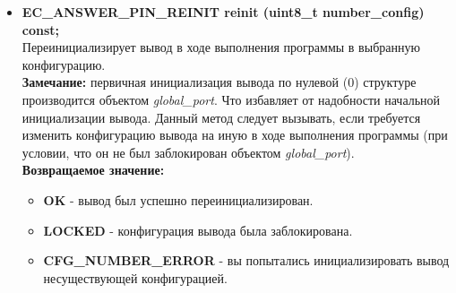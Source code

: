 \begin{itemize}
	\item \textbf{EC\_ANSWER\_PIN\_REINIT	reinit	(uint8\_t number\_config) const;}\\Переинициализирует вывод в ходе выполнения программы в выбранную конфигурацию.\\\textbf{Замечание: }первичная инициализация вывода по нулевой (0) структуре производится объектом \textit{global\_port}. Что избавляет от надобности начальной инициализации вывода. Данный метод следует вызывать, если требуется изменить конфигурацию вывода на иную в ходе выполнения программы (при условии, что он не был заблокирован объектом \textit{global\_port}).\\\textbf{Возвращаемое значение:}
	\begin{itemize}
		\item \textbf{OK} - вывод был успешно переинициализирован.
		\item \textbf{LOCKED} - конфигурация вывода была заблокирована.
		\item \textbf{CFG\_NUMBER\_ERROR} - вы попытались инициализировать вывод несуществующей конфигурацией.
	\end{itemize}
\end{itemize}